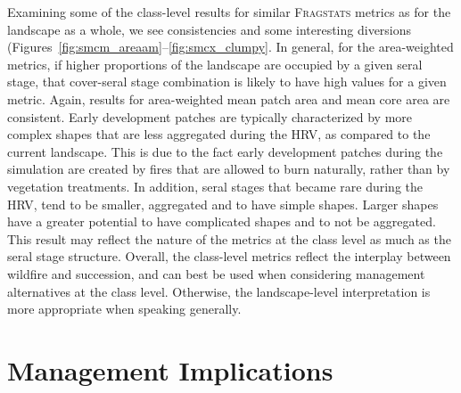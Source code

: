 Examining some of the class-level results for similar \textsc{Fragstats} metrics as for the landscape as a whole, we see consistencies and some interesting diversions (Figures~\ref{fig:smcm_areaam}--\ref{fig:smcx_clumpy}. In general, for the area-weighted metrics, if higher proportions of the landscape are occupied by a given seral stage, that cover-seral stage combination is likely to have high values for a given metric. Again, results for area-weighted mean patch area and mean core area are consistent. Early development patches are typically characterized by more complex shapes that are less aggregated during the HRV, as compared to the current landscape. This is due to the fact early development patches during the simulation are created by fires that are allowed to burn naturally, rather than by vegetation treatments. In addition, seral stages that became rare during the HRV, tend to be smaller, aggregated and to have simple shapes. Larger shapes have a greater potential to have complicated shapes and to not be aggregated. This result may reflect the nature of the metrics at the class level as much as the seral stage structure. Overall, the class-level metrics reflect the interplay between wildfire and succession, and can best be used when considering management alternatives at the class level. Otherwise, the landscape-level interpretation is more appropriate when speaking generally. 



\clearpage
\section{Management Implications}

